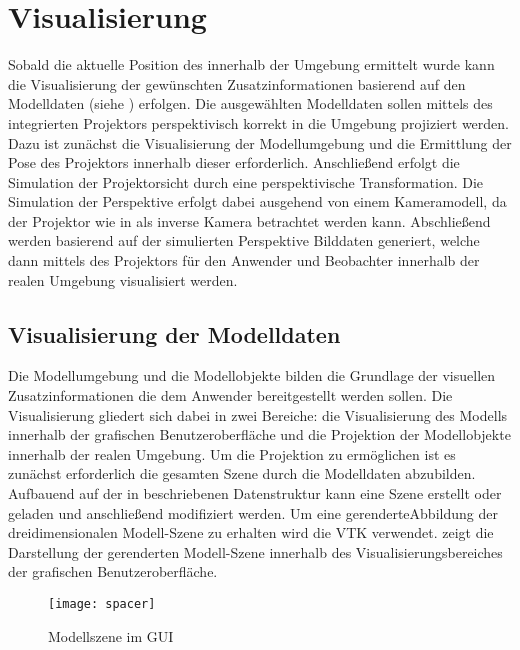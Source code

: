 \chapter{Visualisierung}
Sobald die aktuelle Position des  innerhalb der Umgebung ermittelt wurde kann die Visualisierung der gewünschten Zusatzinformationen basierend auf den Modelldaten (siehe ) erfolgen. Die ausgewählten Modelldaten sollen mittels des integrierten Projektors perspektivisch korrekt in die Umgebung projiziert werden. Dazu ist zunächst die Visualisierung der Modellumgebung und die Ermittlung der Pose des Projektors innerhalb dieser erforderlich. Anschließend erfolgt die Simulation der Projektorsicht durch eine perspektivische Transformation. Die Simulation der Perspektive erfolgt dabei ausgehend von einem Kameramodell, da der Projektor wie in  als inverse Kamera betrachtet werden kann. Abschließend werden basierend auf der simulierten Perspektive Bilddaten generiert, welche dann mittels des Projektors für den Anwender und Beobachter innerhalb der realen Umgebung visualisiert werden.

\section{Visualisierung der Modelldaten}
Die Modellumgebung und die Modellobjekte bilden die Grundlage der visuellen Zusatzinformationen die dem Anwender bereitgestellt werden sollen. Die Visualisierung gliedert sich dabei in zwei Bereiche: die Visualisierung des Modells innerhalb der grafischen Benutzeroberfläche und die Projektion der Modellobjekte innerhalb der realen Umgebung. Um die Projektion zu ermöglichen ist es zunächst erforderlich die gesamten Szene durch die Modelldaten abzubilden. Aufbauend auf der in  beschriebenen Datenstruktur kann eine Szene erstellt oder geladen und anschließend modifiziert werden. Um eine gerenderte\red[footnote?] Abbildung der dreidimensionalen Modell-Szene zu erhalten wird die \red[Visualisierungsbibliothek] VTK verwendet.  zeigt die Darstellung der gerenderten Modell-Szene innerhalb des Visualisierungsbereiches der grafischen Benutzeroberfläche.

\begin{figure}[!ht]
	\begin{center}
		\texttt{[image: spacer]}
		\caption{Modellszene im GUI}
		\label{fig.modscene}
	\end{center}
\end{figure}


